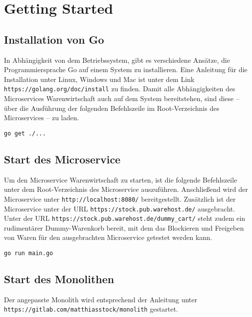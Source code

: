 \section{Getting Started}
\label{sec: Getting Started}

\subsection{Installation von Go}
In Abhängigkeit von dem Betriebssystem, gibt es verschiedene Ansätze, die Programmiersprache Go auf einem System zu installieren. Eine Anleitung für die Installation unter Linux, Windows und Mac ist unter dem Link \texttt{https://golang.org/doc/install} zu finden. Damit alle Abhängigkeiten des Microservices Warenwirtschaft auch auf dem System bereitstehen, sind diese -- über die Ausführung der folgenden Befehlszeile im Root-Verzeichnis des Microservices -- zu laden.
\begin{lstlisting}[caption=Laden der Abhängigkeiten]
go get ./...
\end{lstlisting}

\subsection{Start des Microservice}
Um den Microservice Warenwirtschaft zu starten, ist die folgende Befehlszeile unter dem Root-Verzeichnis des Microservice auszuführen. Anschließend wird der Microservice unter \linebreak \texttt{http://localhost:8080/} bereitgestellt. Zusätzlich ist der Microservice unter der URL \linebreak \texttt{https://stock.pub.warehost.de/} ausgebracht. Unter der URL 
 \texttt{https://stock.pub.\linebreak warehost.de/dummy\_cart/} steht zudem ein rudimentärer Dummy-Warenkorb bereit, mit dem das Blockieren und Freigeben von Waren für den ausgebrachten Microservice getestet werden kann.
\begin{lstlisting}[caption=Start des Go-Microservice]
go run main.go
\end{lstlisting}

\subsection{Start des Monolithen}
Der angepasste Monolith wird entsprechend der Anleitung unter \linebreak \texttt{https://gitlab.com/matthiasstock/monolith} gestartet. 